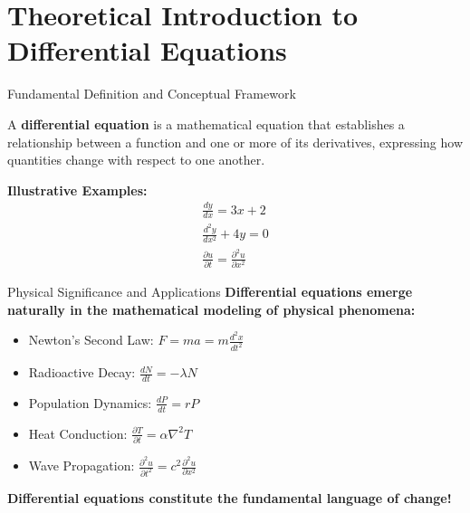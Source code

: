 \documentclass[10pt,aspectratio=169]{beamer}
\newcommand{\concept}[1]{\textbf{#1}}
\begin{document}
\section{Theoretical Introduction to Differential Equations}

\begin{frame}{Fundamental Definition and Conceptual Framework}
    \begin{definition}
        A \concept{differential equation} is a mathematical equation that establishes a relationship between a function and one or more of its derivatives, expressing how quantities change with respect to one another.
    \end{definition}
    
    
    \textbf{Illustrative Examples:}
    \begin{align*}
        \frac{dy}{dx} = 3x + 2 \\  %
        \frac{d^2y}{dx^2} + 4y = 0 \\  %
        \frac{\partial u}{\partial t} = \frac{\partial^2 u}{\partial x^2}  %
    \end{align*}
\end{frame}

\begin{frame}{Physical Significance and Applications}
    \concept{Differential equations emerge naturally in the mathematical modeling of physical phenomena:}
    
    
    \begin{itemize}
        \item Newton's Second Law: $F = ma = m\frac{d^2x}{dt^2}$
        \item Radioactive Decay: $\frac{dN}{dt} = -\lambda N$
        \item Population Dynamics: $\frac{dP}{dt} = rP$
        \item Heat Conduction: $\frac{\partial T}{\partial t} = \alpha \nabla^2 T$
        \item Wave Propagation: $\frac{\partial^2 u}{\partial t^2} = c^2 \frac{\partial^2 u}{\partial x^2}$
    \end{itemize}
    
    
    \begin{center}
        \Large\textbf{Differential equations constitute the fundamental language of change!}
    \end{center}
\end{frame}
\end{document}
